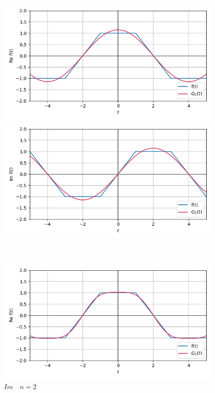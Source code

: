 \documentclass[a4paper]{article}
\begin{document}
\begin{figure}[H]
    \begin{minipage}{0.5\textwidth}
        \centering \includegraphics[width=\textwidth]{parametric_func/Re2.png}
        \caption{$Re\quad n = 2$}
    \end{minipage}\hfill
    \begin{minipage}{0.5\textwidth}
        \centering \includegraphics[width=\textwidth]{parametric_func/Im2.png}
        \caption{$Im\quad n = 2$}
    \end{minipage}\\[2em]
    \begin{minipage}{0.5\textwidth}
        \centering \includegraphics[width=\textwidth]{parametric_func/Re3.png}

\end{minipage}
\end{figure}
\end{document}
